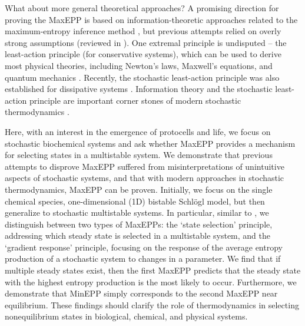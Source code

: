 \documentclass[aps,prl,reprint,singlecolumn,superscriptaddress]{revtex4}
\begin{document}
What about more general theoretical approaches? A promising direction for proving the MaxEPP is based on 
information-theoretic approaches related to the maximum-entropy inference method \cite{dewar03,dewar05}, but previous attempts 
relied on overly strong assumptions (reviewed in \textcolor{black}{\cite{bruers07,dewar09,ross12}}). One extremal principle is undisputed – the least-action principle 
(for conservative systems), which can be used to derive most physical theories, including Newton’s laws, Maxwell’s equations, and 
quantum mechanics \cite{feynman06,doi11}. Recently, the stochastic least-action principle was also established for dissipative systems 
\cite{bialek00,wang06,seifert12}. Information theory and the stochastic least-action principle are important corner stones of modern 
stochastic thermodynamics \cite{seifert12}.

Here, with an interest in the emergence of protocells and life, we focus on stochastic biochemical systems
and ask whether MaxEPP provides a mechanism for selecting states in a multistable system. We demonstrate that previous attempts 
to disprove MaxEPP suffered from {misinterpretations of unintuitive aspects} of stochastic systems, and that 
with modern approaches in stochastic thermodynamics, 
MaxEPP can be proven. Initially, we focus on the single chemical species, one-dimensional (1D) bistable Schl\"ogl model, 
but then generalize to stochastic multistable systems. In particular, similar to \cite{meysman10}, we distinguish between two types of MaxEPPs: 
the `state selection' principle, addressing which steady state is selected in a multistable system, and the `gradient response' principle,
focusing on the response of the average entropy production of a stochastic system to changes in a parameter. We find that if
multiple steady states exist, then the first MaxEPP predicts that the steady state with the 
highest entropy production is the most likely to occur. 
Furthermore, we demonstrate that MinEPP simply corresponds to the second MaxEPP near equilibrium. These findings should 
clarify the role of thermodynamics in selecting nonequilibrium states in biological, chemical, and physical systems.\\
\end{document}
